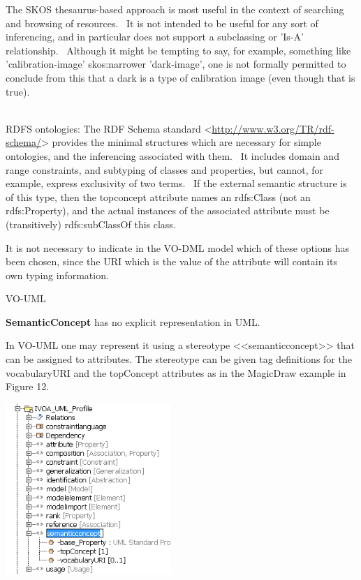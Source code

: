 \documentclass[10pt,a4paper]{ivoa}
\begin{document}
The SKOS thesaurus-based approach is most useful in the context of
searching and browsing of resources.~ It is not intended to be useful
for any sort of inferencing, and in particular does not support a
subclassing or 'Is-A' relationship.~ Although it might be tempting to
say, for example, something like 'calibration-image' skos:narrower
'dark-image', one is not formally permitted to conclude from this that a
dark is a type of calibration image (even though that is true).\\
\strut \\
RDFS ontologies: The RDF Schema standard
\textless{}\url{http://www.w3.org/TR/rdf-schema/}\textgreater{} provides
the minimal structures which are necessary for simple ontologies, and
the inferencing associated with them.~ It includes domain and range
constraints, and subtyping of classes and properties, but cannot, for
example, express exclusivity of two terms.~ If the external semantic
structure is of this type, then the topconcept attribute names an
rdfs:Class (not an rdfs:Property), and the actual instances of the
associated attribute must be (transitively) rdfs:subClassOf this class.

It is not necessary to indicate in the VO-DML model which of these
options has been chosen, since the URI which is the value of the
attribute will contain its own typing information.

VO-UML

\textbf{SemanticConcept} has no explicit representation in UML.

In VO-UML one may represent it using a stereotype
\textless\textless semanticconcept\textgreater\textgreater{} that can be
assigned to attributes. The stereotype can be given tag definitions for
the vocabularyURI and the topConcept attributes as in the MagicDraw
example in Figure 12.

\includegraphics[width=2.46688in,height=2.55856in]{./media/image17.png}
\end{document}
